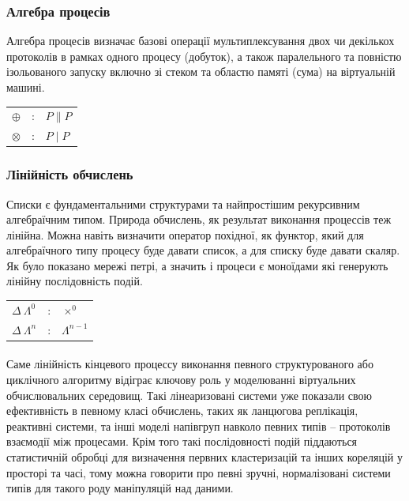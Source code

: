 \documentclass[11pt,oneside]{article}
\begin{document}
  \subsubsection*{Алгебра процесів}

  Алгебра процесів визначає базові операції мультиплексування двох чи декількох
  протоколів в рамках одного процесу (добуток), а також паралельного та повністю
  ізольованого запуску включно зі стеком та областю памяті (сума) на
  віртуальній машині.

\begin{center}
\begin{tabular}{lcl}
$\oplus$   &:& $P \parallel P$\\
$\otimes$  &:& $P \mid P$\\
\end{tabular}
\end{center}

  \subsubsection*{Лінійність обчислень}

   Списки
   є фундаментальними структурами та найпростішим рекурсивним алгебраїчним типом.
   Природа обчислень, як результат виконання процессів теж лінійна. Можна навіть визначити
   оператор похідної, як функтор, який для алгебраїчного типу процесу буде давати список,
   а для списку буде давати скаляр. Як було показано \cite{meseguer} мережі петрі,
   а значить і процеси є моноїдами які генерують лінійну послідовність подій.


\begin{center}
\begin{tabular}{lcl}
$\Delta \ \Lambda^0$         &:& $\times^0$ \\
$\Delta \ \Lambda^{n}$       &:& $\Lambda^{n-1}$ \\
\end{tabular}
\end{center}

   \paragraph{}
   Саме лінійність кінцевого
   процессу виконання певного структурованого або циклічного алгоритму відіграє ключову
   роль у моделюванні віртуальних обчислювальних середовищ. Такі лінеаризовані системи
   уже показали свою ефективність в певному класі обчислень, таких як ланцюгова реплікація,
   реактивні системи, та інші моделі напівгруп навколо певних типів -- протоколів взаємодії між процесами.
   Крім того такі послідовності подій піддаються статистичній обробці для визначення первних кластеризацій
   та інших кореляцій у просторі та часі, тому можна говорити про певні зручні, нормалізовані системи типів для
   такого роду маніпуляцій над даними.
\end{document}
